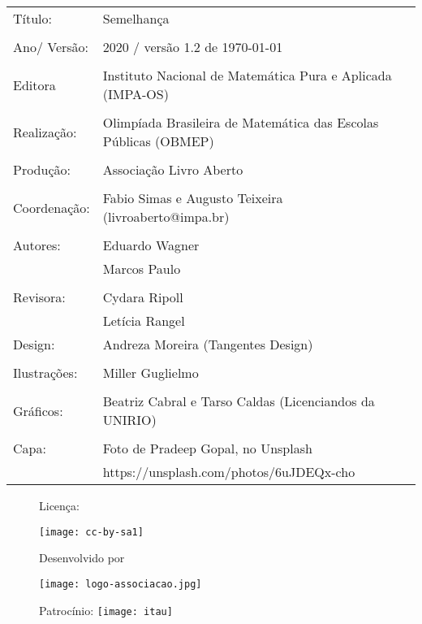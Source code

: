 \begin{tabular}{p{}p{}}
Título: & Semelhança\\
\\
Ano/ Versão: & 2020 / versão 1.2 de \today\\
\\
Editora & Instituto Nacional de Matem\'atica Pura e Aplicada (IMPA-OS)\\
\\
Realização:& Olimp\'iada Brasileira de Matem\'atica das Escolas P\'ublicas (OBMEP)\\
\\
Produção: & Associação Livro Aberto\\
\\
Coordenação: & Fabio Simas e Augusto Teixeira (livroaberto@impa.br)\\
\\
Autores:  & Eduardo Wagner\\
          & Marcos Paulo \\

\\
Revisora: &  Cydara Ripoll  \\
          &  Letícia Rangel
\\
Design: & Andreza Moreira (Tangentes Design) \\
\\
  Ilustrações: & Miller  Guglielmo \\ 
\\
Gráficos: & Beatriz Cabral e Tarso Caldas (Licenciandos da UNIRIO)\\
\\
  Capa: & Foto de Pradeep Gopal, no Unsplash \\
        & https://unsplash.com/photos/6uJDEQx-cho \\

\end{tabular}

\begin{figure}[b]
\begin{minipage}[l]{5cm}
\centering

{\large Licença:}

  \texttt{[image: cc-by-sa1]}
\end{minipage}\hfill
\begin{minipage}[c]{5cm}
\centering
{\large Desenvolvido por}

\texttt{[image: logo-associacao.jpg]}
\end{minipage}
\begin{minipage}[r]{5cm}
\centering

{\large Patrocínio:}
  \vspace{1em}
  \texttt{[image: itau]}
\end{minipage}
\end{figure}

